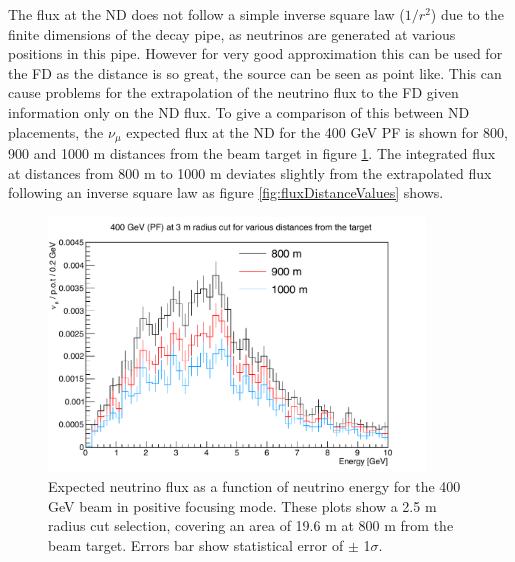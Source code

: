 The flux at the ND does not follow a simple inverse square law ($1/r^{2}$) due to the finite dimensions of the decay pipe, as neutrinos are generated at various positions in this pipe. However for very good approximation this can be used for the FD as the distance is so great, the source can be seen as point like. This can cause problems for the extrapolation of the neutrino flux to the FD given information only on the ND flux. To give a comparison of this between ND placements, the $\nu_{\mu}$ expected flux at the ND for the 400 GeV PF is shown for 800, 900 and 1000 m distances from the beam target in figure \ref{fig:fluxDistances}. The integrated flux at distances from 800 m to 1000 m deviates slightly from the extrapolated flux following an inverse square law as figure \ref{fig:fluxDistanceValues} shows.
\begin{figure}[htbp]
	\begin{center}
		\includegraphics[width=100mm]{Chapter3/figures/400_PF_numu_distancePlot.pdf}
		\caption{Expected neutrino flux as a function of neutrino energy for the 400 GeV beam in positive focusing mode. These plots show a 2.5 m radius cut selection, covering an area of 19.6 m at 800 m from the beam target. Errors bar show statistical error of $\pm$ 1$\sigma$. }
		\label{fig:fluxDistances}
	\end{center}
\end{figure}

